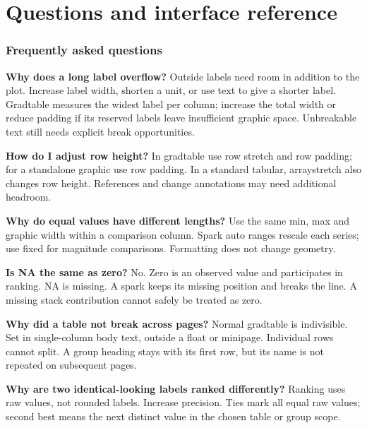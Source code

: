 \part{Questions and interface reference}


\section{Frequently asked questions}
\textbf{Why does a long label overflow?} Outside labels need room in addition to
the plot. Increase label width, shorten a unit, or use text to give a shorter label.
Gradtable measures the widest label per column; increase the total width or reduce
padding if its reserved labels leave insufficient graphic space. Unbreakable text
still needs explicit break opportunities.

\textbf{How do I adjust row height?} In gradtable use row stretch and row padding;
for a standalone graphic use row padding. In a standard tabular, arraystretch also
changes row height. References and change annotations may need additional headroom.

\textbf{Why do equal values have different lengths?} Use the same min, max and
graphic width within a comparison column. Spark auto ranges rescale each series;
use fixed for magnitude comparisons. Formatting does not change geometry.

\textbf{Is NA the same as zero?} No. Zero is an observed value and participates in
ranking. NA is missing. A spark keeps its missing position and breaks the line.
A missing stack contribution cannot safely be treated as zero.

\textbf{Why did a table not break across pages?} Normal gradtable is indivisible.
Set  in single-column body text, outside a float or minipage. Individual
rows cannot split. A group heading stays with its first row, but its name is not
repeated on subsequent pages.

\textbf{Why are two identical-looking labels ranked differently?} Ranking uses raw
values, not rounded labels. Increase precision. Ties mark all equal raw values;
second best means the next distinct value in the chosen table or group scope.
